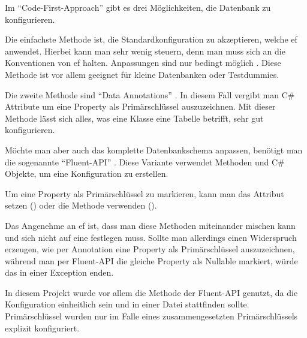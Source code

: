 

Im \enquote{Code-First-Approach} gibt es drei Möglichkeiten, die Datenbank zu konfigurieren.

Die einfachste Methode ist, die Standardkonfiguration zu akzeptieren, welche \gls{ef} anwendet. Hierbei kann man sehr wenig steuern, denn man muss sich an die Konventionen von \gls{ef} halten. Anpassungen sind nur bedingt möglich \cite{conventions}. Diese Methode ist vor allem geeignet für kleine Datenbanken oder Testdummies.


Die zweite Methode sind \enquote{Data Annotations} \cite{dataAnnotations}. In diesem Fall vergibt man C\# Attribute um \zB eine Property als Primärschlüssel auszuzeichnen. Mit dieser Methode lässt sich alles, was eine Klasse \bzw eine Tabelle betrifft, sehr gut konfigurieren.

Möchte man aber auch das komplette Datenbankschema anpassen, benötigt man die sogenannte \enquote{Fluent-API} \cite{fluentAPI}. Diese Variante verwendet Methoden und C\# Objekte, um eine Konfiguration zu erstellen.


Um eine Property als Primärschlüssel zu markieren, kann man \zB das \lstcode{[Key]} Attribut setzen () oder die  Methode verwenden ().

Das Angenehme an \gls{ef} ist, dass man diese Methoden miteinander mischen kann und sich nicht auf eine festlegen muss. Sollte man allerdings einen Widerspruch erzeugen, wie \zB per Annotation eine Property als Primärschlüssel auszuzeichnen, während man per Fluent-API die gleiche Property als Nullable markiert, würde das in einer Exception enden.

In diesem Projekt wurde vor allem die Methode der Fluent-API genutzt, da die Konfiguration einheitlich sein und in einer Datei stattfinden sollte. Primärschlüssel wurden nur im Falle eines zusammengesetzten Primärschlüssels explizit konfiguriert.
